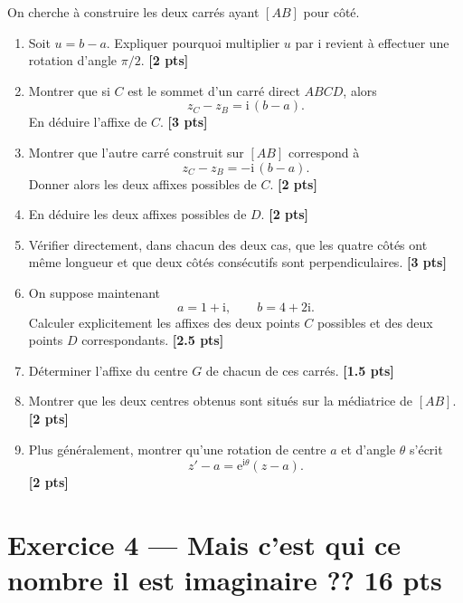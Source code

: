 \documentclass[11pt,a4paper]{article}
\newcommand{\ii}{\mathrm{i}}
\newcommand{\e}{\mathrm{e}}
\newcommand{\bareme}[1]{\hfill{\small\textbf{[#1 pts]}}}
\begin{document}
On cherche à construire les deux carrés ayant \([AB]\) pour côté.

\begin{enumerate}[label=\textbf{\arabic*.}]
    \item Soit \(u=b-a\). Expliquer pourquoi multiplier \(u\) par \(\ii\) revient à effectuer une rotation d'angle \(\pi/2\).
    \bareme{2}

    \item Montrer que si \(C\) est le sommet d'un carré direct \(ABCD\), alors
    \[
    z_C-z_B=\ii\,(b-a).
    \]
    En déduire l'affixe de \(C\).
    \bareme{3}

    \item Montrer que l'autre carré construit sur \([AB]\) correspond à
    \[
    z_C-z_B=-\ii\,(b-a).
    \]
    Donner alors les deux affixes possibles de \(C\).
    \bareme{2}

    \item En déduire les deux affixes possibles de \(D\).
    \bareme{2}

    \item Vérifier directement, dans chacun des deux cas, que les quatre côtés ont même longueur et que deux côtés consécutifs sont perpendiculaires.
    \bareme{3}

    \item On suppose maintenant
    \[
    a=1+\ii,\qquad b=4+2\ii.
    \]
    Calculer explicitement les affixes des deux points \(C\) possibles et des deux points \(D\) correspondants.
    \bareme{2.5}

    \item Déterminer l'affixe du centre \(G\) de chacun de ces carrés.
    \bareme{1.5}

    \item Montrer que les deux centres obtenus sont situés sur la médiatrice de \([AB]\).
    \bareme{2}

    \item Plus généralement, montrer qu'une rotation de centre \(a\) et d'angle \(\theta\) s'écrit
    \[
    z'-a=\e^{\ii\theta}(z-a).
    \]
    \bareme{2}
\end{enumerate}

\bigskip


\section*{Exercice 4 --- Mais c'est qui ce nombre il est imaginaire ?? \hfill \textbf{16 pts}}
\end{document}
